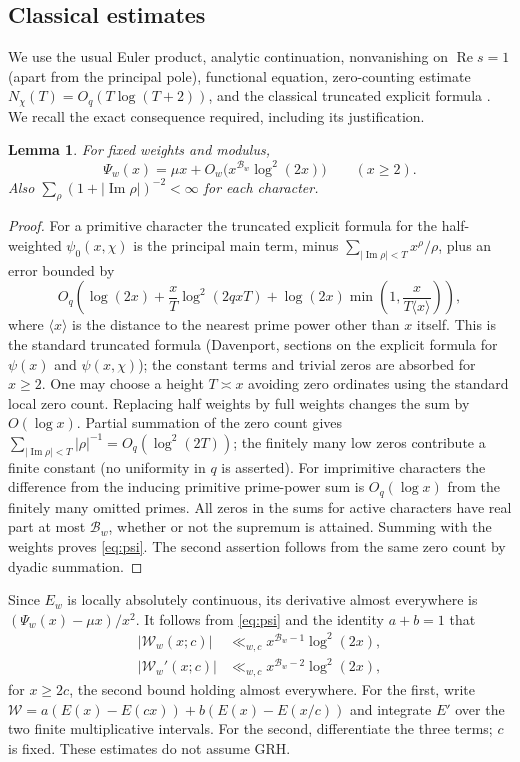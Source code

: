 \documentclass[11pt]{article}
\newtheorem{lemma}[theorem]{Lemma}
\theoremstyle{remark}\newtheorem{remark}[theorem]{Remark}
\newcommand{\Rea}{\operatorname{Re}}\newcommand{\Ima}{\operatorname{Im}}
\newcommand{\B}{\mathcal B}\newcommand{\W}{\mathcal W}
\begin{document}
\subsection{Classical estimates}
We use the usual Euler product, analytic continuation, nonvanishing on $\Rea s=1$ (apart from the principal pole), functional equation, zero-counting estimate $N_\chi(T)=O_q(T\log(T+2))$, and the classical truncated explicit formula \cite{davenport,mv,lee}. We recall the exact consequence required, including its justification.
\begin{lemma}\label{lem:psi}
For fixed weights and modulus,
\begin{equation}\label{eq:psi}
 \Psi_w(x)=\mu x+O_w\bigl(x^{\B_w}\log^2(2x)\bigr) \qquad (x\ge2).
\end{equation}
Also $\sum_{\rho}(1+|\Ima\rho|)^{-2}<\infty$ for each character.
\end{lemma}
\begin{proof}
For a primitive character the truncated explicit formula for the half-weighted $\psi_0(x,\chi)$ is the principal main term, minus $\sum_{|\Ima\rho|<T}x^\rho/\rho$, plus an error bounded by
\[
 O_q\left(\log(2x)+\frac{x}{T}\log^2(2qxT)
 +\log(2x)\min\left(1,\frac{x}{T\langle x\rangle}\right)\right),
\]
where $\langle x\rangle$ is the distance to the nearest prime power other than $x$ itself. This is the standard truncated formula (Davenport, sections on the explicit formula for $\psi(x)$ and $\psi(x,\chi)$); the constant terms and trivial zeros are absorbed for $x\ge2$. One may choose a height $T\asymp x$ avoiding zero ordinates using the standard local zero count. Replacing half weights by full weights changes the sum by $O(\log x)$. Partial summation of the zero count gives $\sum_{|\Ima\rho|<T}|\rho|^{-1}=O_q(\log^2(2T))$; the finitely many low zeros contribute a finite constant (no uniformity in $q$ is asserted). For imprimitive characters the difference from the inducing primitive prime-power sum is $O_q(\log x)$ from the finitely many omitted primes. All zeros in the sums for active characters have real part at most $\B_w$, whether or not the supremum is attained. Summing with the weights proves \eqref{eq:psi}. The second assertion follows from the same zero count by dyadic summation.
\end{proof}
Since $E_w$ is locally absolutely continuous, its derivative almost everywhere is $(\Psi_w(x)-\mu x)/x^2$. It follows from \eqref{eq:psi} and the identity $a+b=1$ that
\begin{align}
 |\W_w(x;c)|&\ll_{w,c}x^{\B_w-1}\log^2(2x),\label{eq:Wbound}\\
 |\W_w'(x;c)|&\ll_{w,c}x^{\B_w-2}\log^2(2x),\label{eq:Wderiv}
\end{align}
for $x\ge2c$, the second bound holding almost everywhere. For the first, write $\W=a(E(x)-E(cx))+b(E(x)-E(x/c))$ and integrate $E'$ over the two finite multiplicative intervals. For the second, differentiate the three terms; $c$ is fixed. These estimates do not assume GRH.
\end{document}
